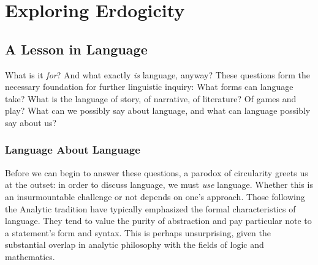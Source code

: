\documentclass[10pt,twoside,twocolumn,openany,nomultitoc]{book}
\begin{document}


\chapter{Exploring Erdogicity} 
\section{A Lesson in Language}\vspace{2pt}
      What is it \textit{for}?
     And what exactly \textit{is} language, anyway? These questions form the necessary foundation for further linguistic inquiry: What forms can language take? What is the language of story, of narrative, of literature? Of games and play? What can we possibly say about language, and what can language possibly say about us?
     
\subsection{Language About Language}

     Before we can begin to answer these questions, a parodox of circularity greets us at the outset: in order to discuss language, we must \textit{use} language. Whether this is an insurmountable challenge or not depends on one's approach.
     Those following the Analytic tradition have typically emphasized the formal characteristics of language. They tend to value the purity of abstraction and pay particular note to a statement's form and syntax. This is perhaps unsurprising, given the substantial overlap in analytic philosophy with the fields of logic and mathematics.
     
\end{document}
